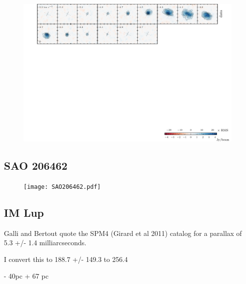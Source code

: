 \documentclass{aastex6}
\begin{document}
\begin{figure}[htb]
\begin{center}
  \includegraphics{TWHya.pdf}
  \end{center}
\end{figure}

\subsection{SAO 206462}

\begin{figure}[htb]
\begin{center}
  \texttt{[image: SAO206462.pdf]}
  \end{center}
\end{figure}

\subsection{IM Lup}

Galli and Bertout quote the SPM4 (Girard et al 2011) catalog for a parallax of 5.3 +/- 1.4 milliarcseconds.

I convert this to 188.7 +/-
149.3 to 256.4

- 40pc + 67 pc
\end{document}
